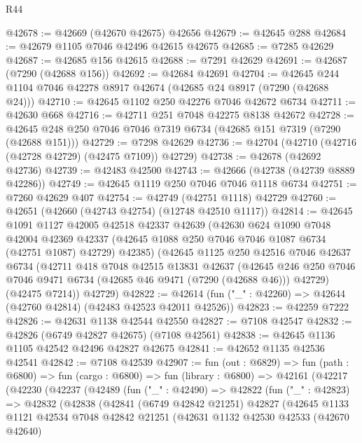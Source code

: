 \begin{lexlean}{R44}
\begin{coremodule}
{@42678 := @42669 (@42670 @42675) @42656
@42679 := @42645 @288
@42684 := @42679 @1105 @7046 @42496 @42615 @42675
@42685 := @7285 @42629
@42687 := @42685 @156 @42615
@42688 := @7291 @42629
@42691 := @42687 (@7290 (@42688 @156))
@42692 := @42684 @42691
@42704 := @42645 @244 @1104 @7046 @42278 @8917 @42674 (@42685 @24 @8917 (@7290 (@42688 @24)))
@42710 := @42645 @1102 @250 @42276 @7046 @42672 @6734
@42711 := @42630 @668
@42716 := @42711 @251 @7048 @42275 @8138 @42672
@42728 := @42645 @248 @250 @7046 @7046 @7319 @6734 (@42685 @151 @7319 (@7290 (@42688 @151)))
@42729 := @7298 @42629
@42736 := @42704 (@42710 (@42716 (@42728 @42729) (@42475 @7109)) @42729)
@42738 := @42678 (@42692 @42736)
@42739 := @42483 @42500
@42743 := @42666 (@42738 (@42739 @8889 @42286))
@42749 := @42645 @1119 @250 @7046 @7046 @1118 @6734
@42751 := @7260 @42629 @407
@42754 := @42749 (@42751 @1118) @42729
@42760 := @42651 (@42660 (@42743 @42754) (@12748 @42510 @1117))
@42814 := @42645
    @1091
    @1127
    @42005
    @42518
    @42337
    @42639
    (@42630
      @624
      @1090
      @7048
      @42004
      @42369
      @42337
      (@42645 @1088 @250 @7046 @7046 @1087 @6734 (@42751 @1087) @42729)
      @42385)
    (@42645
      @1125
      @250
      @42516
      @7046
      @42637
      @6734
      (@42711
        @418
        @7048
        @42515
        @13831
        @42637
        (@42645 @246 @250 @7046 @7046 @9471 @6734 (@42685 @46 @9471 (@7290 (@42688 @46))) @42729)
        (@42475 @7214))
      @42729)
@42822 := @42614 (fun ("_" : @42260) => @42644 (@42760 @42814) (@42483 @42523 @42011 @42526))
@42823 := @42259 @7222
@42826 := @42631 @1138 @42544 @42550
@42827 := @7108 @42547
@42832 := @42826 (@6749 @42827 @42675) (@7108 @42561)
@42838 := @42645 @1136 @1105 @42542 @42496 @42827 @42675
@42841 := @42652 @1135 @42536 @42541
@42842 := @7108 @42539
@42907 := fun (out : @6829) =>
  fun (path : @6800) =>
  fun (cargo : @6800) =>
  fun (library : @6800) =>
  @42161
    (@42217
      (@42230
        (@42237
          (@42489
            (fun ("_" : @42490) =>
            @42822
              (fun ("_" : @42823) =>
              @42832
                (@42838
                  (@42841
                    (@6749 @42842 @21251)
                    @42827
                    (@42645
                      @1133
                      @1121
                      @42534
                      @7048
                      @42842
                      @21251
                      (@42631
                        @1132
                        @42530
                        @42533
                        (@42670 @42640)
}
\end{coremodule}
\end{lexlean}

